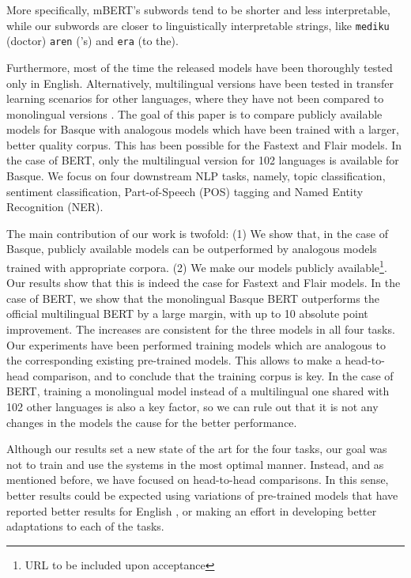 \documentclass[10pt, a4paper]{article}
\begin{document}
More specifically, mBERT's subwords tend to be shorter and less interpretable, while our subwords are closer to linguistically interpretable strings, like \texttt{mediku} (doctor) \texttt{aren} ('s) and \texttt{era} (to the).

Furthermore, most of the time the released models have been thoroughly tested only in English. Alternatively, multilingual versions have been tested in transfer learning scenarios for other languages, where they have not been compared to monolingual versions \cite{devlin2019bert}.
The goal of this paper is to compare publicly available models for Basque with analogous models which have been trained with a larger, better quality corpus. This has been possible for the Fastext and Flair models. In the case of BERT, only the multilingual version for 102 languages is available for Basque. We focus on four downstream NLP tasks, namely, topic classification, sentiment classification, Part-of-Speech (POS) tagging and Named Entity Recognition (NER).

The main contribution of our work is twofold: (1) We show that, in the case of Basque, publicly available models can be outperformed by analogous models trained with appropriate corpora. (2) We make our models publicly available\footnote{URL to be included upon acceptance}. Our results show that this is indeed the case for Fastext and Flair models. In the case of BERT, we show that the monolingual Basque BERT outperforms the official multilingual BERT by a large margin, with up to 10 absolute point improvement. The increases are consistent for the three models in all four tasks. Our experiments have been performed training models which are analogous to the corresponding existing pre-trained models. This allows to make a head-to-head comparison, and to conclude that the training corpus is key. In the case of BERT, training a monolingual model instead of a multilingual one shared with 102 other languages is also a key factor, so we can rule out that it is not any changes in the models the cause for the better performance.

Although our results set a new state of the art for the four tasks, our goal was not to train and use the systems in the most optimal manner. Instead, and as mentioned before, we have focused on head-to-head comparisons. In this sense, better results could be expected using variations of pre-trained models that have reported better results for English \cite{liu2019roberta}, or making an effort in developing better adaptations to each of the tasks.
\end{document}
